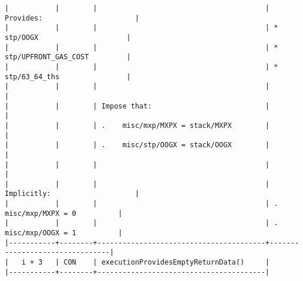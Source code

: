 \documentclass[varwidth=\maxdimen,margin=0.5cm,multi={verbatim}]{standalone}
\begin{document}
\begin{verbatim}
|           |        |                                        | Provides:                      |
|           |        |                                        | * stp/OOGX                     |
|           |        |                                        | * stp/UPFRONT_GAS_COST         |
|           |        |                                        | * stp/63_64_ths                |
|           |        |                                        |                                |
|           |        | Impose that:                           |                                |
|           |        | .    misc/mxp/MXPX = stack/MXPX        |                                |
|           |        | .    misc/stp/OOGX = stack/OOGX        |                                |
|           |        |                                        |                                |
|           |        |                                        | Implicitly:                    |
|           |        |                                        | .   misc/mxp/MXPX = 0          |
|           |        |                                        | .   misc/mxp/OOGX = 1          |
|-----------+--------+----------------------------------------+--------------------------------|
|   i + 3   | CON    | executionProvidesEmptyReturnData()     |
|-----------+--------+----------------------------------------|

\end{verbatim}
\end{document}
